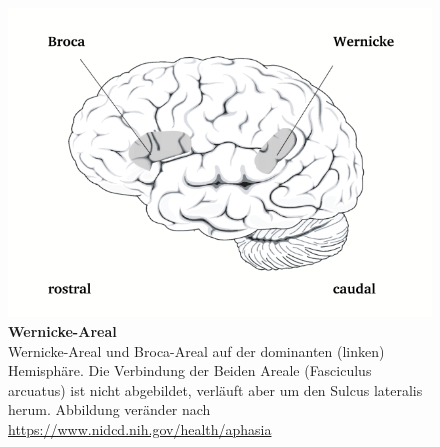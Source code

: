 \documentclass[12pt,a4paper,pdftex]{article}
\begin{document}
\begin{figure}[H]
    \centering
    \includegraphics{pictures/auditory/Wernicke.png}
    \caption[Wernicke-Areal]{\textbf{Wernicke-Areal}\\ 
    Wernicke-Areal und Broca-Areal auf der dominanten (linken) Hemisphäre. Die Verbindung der Beiden Areale (Fasciculus arcuatus) ist nicht abgebildet, verläuft aber um den Sulcus lateralis herum.
    Abbildung veränder nach \url{https://www.nidcd.nih.gov/health/aphasia}}
    \label{fig:Wernicke}
\end{figure}
\end{document}
